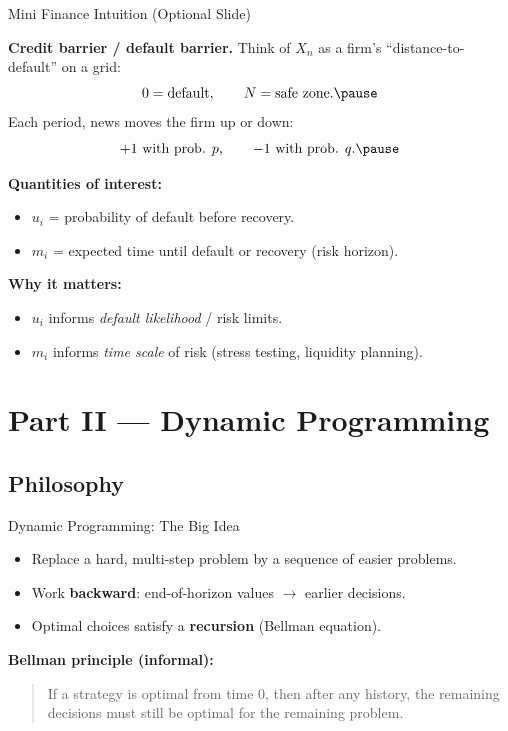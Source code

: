 \documentclass[aspectratio=169]{beamer}
\begin{document}
\begin{frame}{Mini Finance Intuition (Optional Slide)}

\textbf{Credit barrier / default barrier.}
Think of $X_n$ as a firm's “distance-to-default” on a grid:
\[
0=\text{default},\qquad N=\text{safe zone}.\pause
\]
Each period, news moves the firm up or down:
\[
+1 \text{ with prob. } p,\qquad -1 \text{ with prob. } q.\pause
\]

\textbf{Quantities of interest:}
\begin{itemize}
  \item $u_i$ = probability of default before recovery.\pause
  \item $m_i$ = expected time until default or recovery (risk horizon).\pause
\end{itemize}

\medskip
\textbf{Why it matters:}
\begin{itemize}
  \item $u_i$ informs \emph{default likelihood} / risk limits.\pause
  \item $m_i$ informs \emph{time scale} of risk (stress testing, liquidity planning).
\end{itemize}

\end{frame}

\section{Part II --- Dynamic Programming}

\subsection{Philosophy}

\begin{frame}{Dynamic Programming: The Big Idea}
\begin{itemize}
  \item Replace a hard, multi-step problem by a sequence of easier problems.\pause
  \item Work \textbf{backward}: end-of-horizon values $\rightarrow$ earlier decisions.\pause
  \item Optimal choices satisfy a \textbf{recursion} (Bellman equation).\pause
\end{itemize}

\medskip

\textbf{Bellman principle (informal):}
\begin{quote}
If a strategy is optimal from time $0$, then after any history, the remaining decisions must still be optimal for the remaining problem.
\end{quote}
\end{frame}
\end{document}
